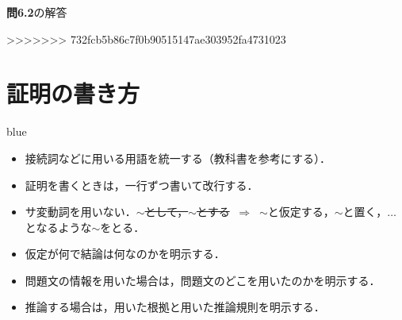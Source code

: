 \documentclass[11pt,dvipdfmx]{jreport}
\begin{document}
\vspace{5mm}
\par

\noindent \textbf{問6.2}の解答
\par

>>>>>>> 732fcb5b86c7f0b90515147ae303952fa4731023

\vspace{5mm}
\par


\newpage

\appendix

\section*{証明の書き方}
\begin{color}{blue}
\begin{itemize}
 \item 接続詞などに用いる用語を統一する（教科書を参考にする）．
 \item 証明を書くときは，一行ずつ書いて改行する．
 \item サ変動詞を用いない．\sout{$\sim$として，$\sim$とする} $\ \Longrightarrow \ $ $\sim$と仮定する，$\sim$と置く，$\dots$となるような$\sim$をとる．
 \item 仮定が何で結論は何なのかを明示する．
 \item 問題文の情報を用いた場合は，問題文のどこを用いたのかを明示する．
 \item 推論する場合は，用いた根拠と用いた推論規則を明示する．
\end{itemize}
\end{color}


\end{document}

